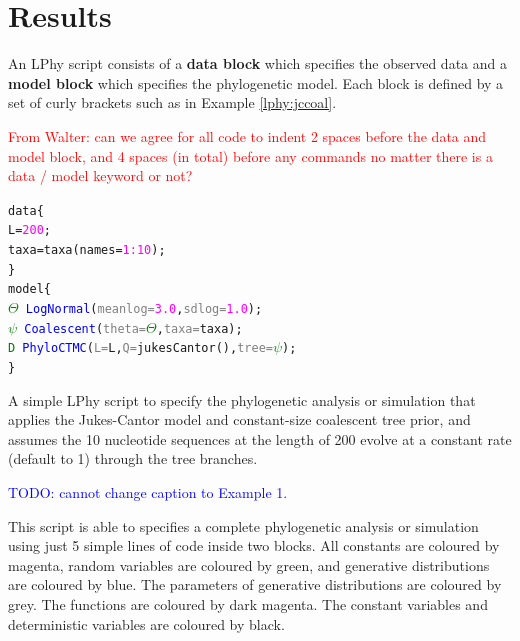 \documentclass[10pt,letterpaper,table]{article}
\begin{document}
{%

\section{Results}

An LPhy script consists of a \textbf{data block} which specifies the observed data and a \textbf{model block} which specifies the phylogenetic model. 
Each block is defined by a set of curly brackets such as in Example \ref{lphy:jccoal}.

\textcolor{red}{From Walter: can we agree for all code to indent 2 spaces before the data and model block, and 4 spaces (in total) before any commands no matter there is a data / model keyword or not?}

{
  \small
  \begin{listing}
    \begin{alltt}
  data \{
    L = \textcolor{magenta}{200};
    taxa = \textcolor{magenta!80!black}{taxa}(names=\textcolor{magenta}{1:10});
  \}
  model \{
    \textcolor{green}{\(\Theta\)} ~ \textcolor{blue}{LogNormal}(\textcolor{gray}{meanlog=}\textcolor{magenta}{3.0}, \textcolor{gray}{sdlog=}\textcolor{magenta}{1.0});
    \textcolor{green}{\(\psi\)} ~ \textcolor{blue}{Coalescent}(\textcolor{gray}{theta=}\textcolor{green}{\(\Theta\)}, \textcolor{gray}{taxa=}taxa);
    \textcolor{green}{D} ~ \textcolor{blue}{PhyloCTMC}(\textcolor{gray}{L=}L, \textcolor{gray}{Q=}\textcolor{magenta!80!black}{jukesCantor}(), \textcolor{gray}{tree=}\textcolor{green}{\(\psi\)});
  \}
    \end{alltt}
    \caption{A simple LPhy script to specify the phylogenetic analysis or simulation that applies the Jukes-Cantor model and constant-size coalescent tree prior, and assumes the 10 nucleotide sequences at the length of 200 evolve at a constant rate (default to 1) through the tree branches.}
    \label{lphy:jccoal}
  \end{listing}
}
\textcolor{blue}{TODO: cannot change caption to Example 1.}

This script is able to specifies a complete phylogenetic analysis or simulation using just 5 simple lines of code inside two blocks. 
All constants are coloured by magenta, random variables are coloured by green, and generative distributions are coloured by blue. The parameters of generative distributions are coloured by grey. The functions are coloured by dark magenta. The constant variables and deterministic variables are coloured by black.

}
\end{document}
